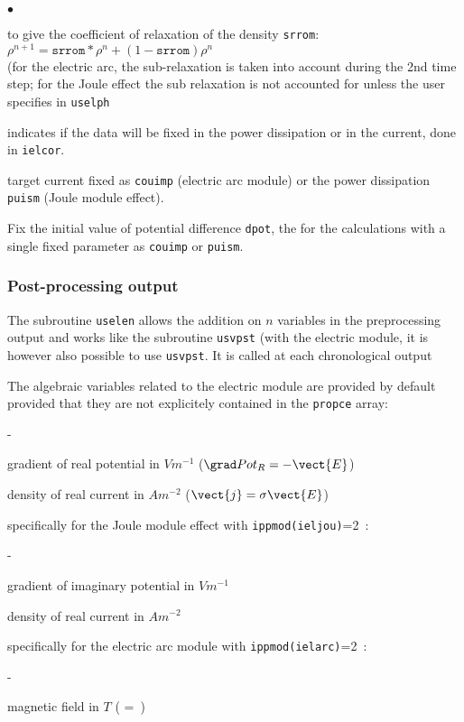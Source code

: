 {{{\begin{list}{$\bullet$}{}
       \item to give the coefficient of relaxation of the density \texttt{srrom}:\\
$\rho^{n+1}=\texttt{srrom}*\rho^{n}+(1-\texttt{srrom})\rho^{n}$\\
(for the electric arc, the sub-relaxation is taken into account during the 2nd time
 step; for the Joule effect the sub relaxation is not accounted for unless the user
 specifies in \texttt{uselph}

       \item indicates if the data will be fixed in the power dissipation or
 in the current, done in \texttt{ielcor}.
       \item target current fixed as \texttt{couimp} (electric arc module)
 or the power dissipation \texttt{puism} (Joule module effect).
       \item Fix the initial value of potential difference \texttt{dpot},
 the for the calculations with a single fixed parameter as \texttt{couimp}
 or \texttt{puism}.

\end{list}

\subsubsection[{\em EnSight} output]
{Post-processing output}

The subroutine \texttt{uselen} allows the addition on $n$ variables in the
 preprocessing output and
 works like the subroutine \texttt{usvpst} (with the electric module, it is however also
 possible to use \texttt{usvpst}. It is called at each chronological output

The algebraic variables related to the electric module are provided by default provided
 that they are not explicitely contained in the \texttt{propce} array:
\begin{list}{-}{}
\item gradient of real potential in $V m^{-1}$ ($\grad Pot_R = -\vect{E}$)
\item density of real current in $A m^{-2}$  ($\vect{j}=\sigma \vect{E}$)
\end{list}
specifically for the Joule module effect with \texttt{ippmod(ieljou)}=2~:
\begin{list}{-}{}
\item gradient of imaginary potential in $V m^{-1}$
\item density of real current in $A m^{-2}$
\end{list}
specifically for the electric arc module with \texttt{ippmod(ielarc)}=2~:
\begin{list}{-}{}
\item magnetic field in $T$ ( = \,)
\end{list}

}}}
